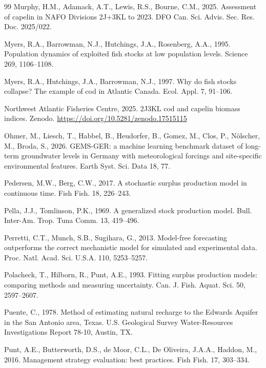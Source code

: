 \begin{thebibliography}{99}
Murphy, H.M., Adamack, A.T., Lewis, R.S., Bourne, C.M., 2025. Assessment of capelin in NAFO Divisions 2J+3KL to 2023. DFO Can. Sci. Advis. Sec. Res. Doc. 2025/022.

Myers, R.A., Barrowman, N.J., Hutchings, J.A., Rosenberg, A.A., 1995. Population dynamics of exploited fish stocks at low population levels. Science 269, 1106--1108.

Myers, R.A., Hutchings, J.A., Barrowman, N.J., 1997. Why do fish stocks collapse? The example of cod in Atlantic Canada. Ecol. Appl. 7, 91--106.

Northwest Atlantic Fisheries Centre, 2025. 2J3KL cod and capelin biomass indices. Zenodo. \url{https://doi.org/10.5281/zenodo.17515115}

Ohmer, M., Liesch, T., Habbel, B., Heudorfer, B., Gomez, M., Clos, P., N{\"o}lscher, M., Broda, S., 2026. GEMS-GER: a machine learning benchmark dataset of long-term groundwater levels in Germany with meteorological forcings and site-specific environmental features. Earth Syst. Sci. Data 18, 77.

Pedersen, M.W., Berg, C.W., 2017. A stochastic surplus production model in continuous time. Fish Fish. 18, 226--243.

Pella, J.J., Tomlinson, P.K., 1969. A generalized stock production model. Bull. Inter-Am. Trop. Tuna Comm. 13, 419--496.

Perretti, C.T., Munch, S.B., Sugihara, G., 2013. Model-free forecasting outperforms the correct mechanistic model for simulated and experimental data. Proc. Natl. Acad. Sci. U.S.A. 110, 5253--5257.

Polacheck, T., Hilborn, R., Punt, A.E., 1993. Fitting surplus production models: comparing methods and measuring uncertainty. Can. J. Fish. Aquat. Sci. 50, 2597--2607.

Puente, C., 1978. Method of estimating natural recharge to the Edwards Aquifer in the San Antonio area, Texas. U.S. Geological Survey Water-Resources Investigations Report 78-10, Austin, TX.

Punt, A.E., Butterworth, D.S., de Moor, C.L., De Oliveira, J.A.A., Haddon, M., 2016. Management strategy evaluation: best practices. Fish Fish. 17, 303--334.


\end{thebibliography}
